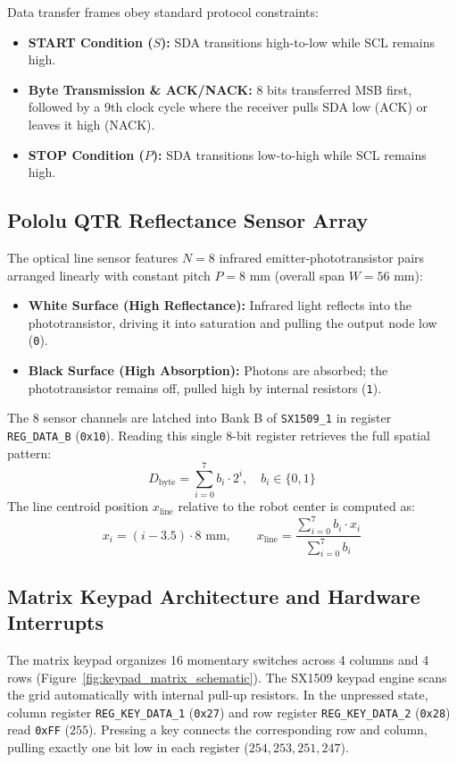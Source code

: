 Data transfer frames obey standard protocol constraints:
\begin{itemize}[noitemsep,topsep=2pt]
    \item \textbf{START Condition ($S$):} SDA transitions high-to-low while SCL remains high.
    \item \textbf{Byte Transmission \& ACK/NACK:} 8 bits transferred MSB first, followed by a 9th clock cycle where the receiver pulls SDA low (ACK) or leaves it high (NACK).
    \item \textbf{STOP Condition ($P$):} SDA transitions low-to-high while SCL remains high.
\end{itemize}

\subsection{Pololu QTR Reflectance Sensor Array}
The optical line sensor features $N = 8$ infrared emitter-phototransistor pairs arranged linearly with constant pitch $P = 8\text{ mm}$ (overall span $W = 56\text{ mm}$):
\begin{itemize}[noitemsep,topsep=2pt]
    \item \textbf{White Surface (High Reflectance):} Infrared light reflects into the phototransistor, driving it into saturation and pulling the output node low (\texttt{0}).
    \item \textbf{Black Surface (High Absorption):} Photons are absorbed; the phototransistor remains off, pulled high by internal resistors (\texttt{1}).
\end{itemize}
The 8 sensor channels are latched into Bank B of \texttt{SX1509\_1} in register \texttt{REG\_DATA\_B} (\texttt{0x10}). Reading this single 8-bit register retrieves the full spatial pattern:
\begin{equation}
    D_{\text{byte}} = \sum_{i=0}^{7} b_i \cdot 2^i, \quad b_i \in \{0, 1\}
\end{equation}
The line centroid position $x_{\text{line}}$ relative to the robot center is computed as:
\begin{equation}
    x_i = (i - 3.5) \cdot 8\text{ mm}, \qquad x_{\text{line}} = \frac{\sum_{i=0}^{7} b_i \cdot x_i}{\sum_{i=0}^{7} b_i}
    \label{eq:centroid}
\end{equation}

\subsection{Matrix Keypad Architecture and Hardware Interrupts}
The matrix keypad organizes 16 momentary switches across 4 columns and 4 rows (Figure~\ref{fig:keypad_matrix_schematic}). The SX1509 keypad engine scans the grid automatically with internal pull-up resistors. In the unpressed state, column register \texttt{REG\_KEY\_DATA\_1} (\texttt{0x27}) and row register \texttt{REG\_KEY\_DATA\_2} (\texttt{0x28}) read \texttt{0xFF} ($255$). Pressing a key connects the corresponding row and column, pulling exactly one bit low in each register ($254, 253, 251, 247$).

